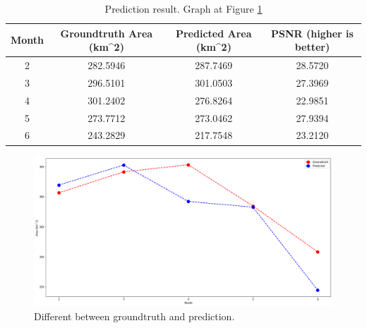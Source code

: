\begin{table}[h!]
	\centering
	\begin{tabular}{|c|c|c|c|}
		\hline
		\textbf{Month} & \textbf{Groundtruth Area (km\textasciicircum{}2)} & \textbf{Predicted Area (km\textasciicircum{}2)} & \textbf{PSNR (higher is better)} \\ \hline
		2              & 282.5946                                          & 287.7469                                        & 28.5720                          \\ \hline
		3              & 296.5101                                          & 301.0503                                        & 27.3969                          \\ \hline
		4              & 301.2402                                          & 276.8264                                        & 22.9851                          \\ \hline
		5              & 273.7712                                          & 273.0462                                        & 27.9394                          \\ \hline
		6              & 243.2829                                          & 217.7548                                        & 23.2120                          \\ \hline
	\end{tabular}
	\caption{Prediction result. Graph at Figure \ref{fig:comparePredict}}
	\label{table:predictValue}
\end{table}


\begin{figure}[h!]
	\centering
	\includegraphics[width=1\textwidth]{figures/comparePredict.png}
	\caption{Different between groundtruth and prediction.}
	\label{fig:comparePredict}
\end{figure}

